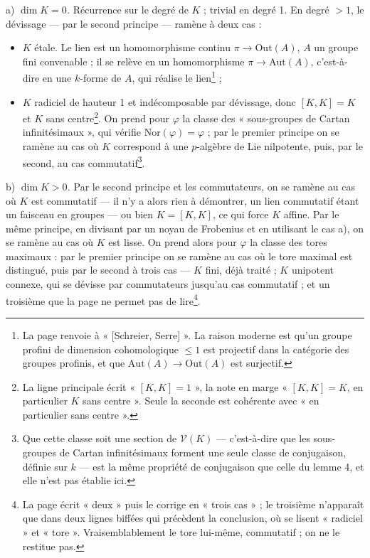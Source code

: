\documentclass[11pt,a4paper]{article}
\begin{document}
a) \emph{$\dim K = 0$.} Récurrence sur le degré de $K$ ; trivial en degré 1. En
degré $> 1$, le dévissage — par le second principe — ramène à deux cas :
\begin{itemize}
\item[(i)] $K$ étale. Le lien est un homomorphisme continu
$\pi \to \mathrm{Out}(A)$, $A$ un groupe fini convenable ; il se relève en un
homomorphisme $\pi \to \mathrm{Aut}(A)$, c'est-à-dire en une $k$-forme de $A$, qui
réalise le lien\footnote{La page renvoie à « [Schreier, Serre] ». La raison
moderne est qu'un groupe profini de dimension cohomologique $\leq 1$ est
projectif dans la catégorie des groupes profinis, et que
$\mathrm{Aut}(A) \to \mathrm{Out}(A)$ est surjectif.} ;
\item[(ii)] $K$ radiciel de hauteur 1 et indécomposable par dévissage, donc
$[K,K] = K$ et $K$ sans centre\footnote{La ligne principale écrit
« $[K,K] = 1$ », la note en marge « $[K,K] = K$, en particulier $K$ sans
centre ». Seule la seconde est cohérente avec « en particulier sans centre ».}.
On prend pour $\varphi$ la classe des « sous-groupes de Cartan infinitésimaux »,
qui vérifie $\mathrm{Nor}(\varphi) = \varphi$ ; par le premier principe on se
ramène au cas où $K$ correspond à une $p$-algèbre de Lie nilpotente, puis, par le
second, au cas commutatif\footnote{Que cette classe soit une section de
$\mathcal{V}(K)$ — c'est-à-dire que les sous-groupes de Cartan infinitésimaux
forment une seule classe de conjugaison, définie sur $k$ — est la même
propriété de conjugaison que celle du lemme 4, et elle n'est pas établie ici.}.
\end{itemize}

b) \emph{$\dim K > 0$.} Par le second principe et les commutateurs, on se
ramène au cas où $K$ est commutatif — il n'y a alors rien à démontrer, un lien
commutatif étant un faisceau en groupes — ou bien $K = [K,K]$, ce qui force $K$
affine. Par le même principe, en divisant par un noyau de Frobenius et en
utilisant le cas a), on se ramène au cas où $K$ est lisse. On prend alors pour $\varphi$ la
classe des tores maximaux : par le premier principe on se ramène au cas où le
tore maximal est distingué, puis par le second à trois cas — $K$ fini, déjà
traité ; $K$ unipotent connexe, qui se dévisse par commutateurs jusqu'au cas
commutatif ; et un troisième que la page ne permet pas de lire\footnote{La page
écrit « deux » puis le corrige en « trois cas » ; le troisième n'apparaît que
dans deux lignes biffées qui précèdent la conclusion, où se lisent
« radiciel » et « tore ». Vraisemblablement le tore lui-même, commutatif ; on ne
le restitue pas.}.
\end{document}
